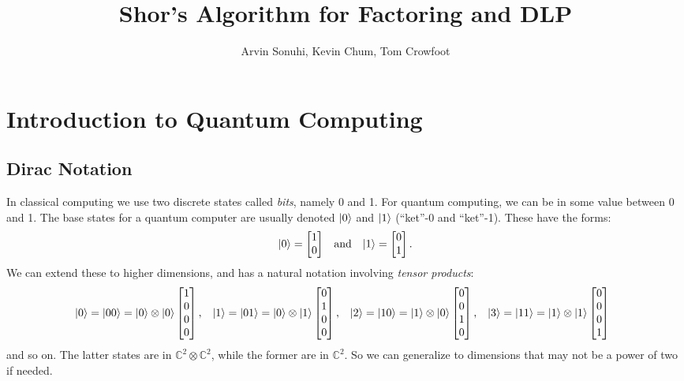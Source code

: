 \documentclass[letterpaper]{article}
\title{Shor's Algorithm for Factoring and DLP}
\author{Arvin Sonuhi, Kevin Chum, Tom Crowfoot}
\date{}
\DeclarePairedDelimiter{\ket}{\lvert}{\rangle}
\newcommand{\complex}{\mathbb{C}}
\newcommand{\tensor}{\otimes}
\begin{document}
	\maketitle{}
	\section{Introduction to Quantum Computing}
	\subsection{Dirac Notation}
	In classical computing we use two discrete states called \emph{bits}, namely
	0 and 1. For quantum computing, we can be in some value between 0 and 1. The
	base states for a quantum computer are usually denoted $\ket0$ and $\ket1$
	(``ket''-0 and ``ket''-1). These have the forms:
	\begin{align*}
		\ket0 = \begin{bmatrix}1\\0\end{bmatrix} &&\text{and} && \ket1 =
		\begin{bmatrix}0\\1\end{bmatrix}.
	\end{align*}
	We can extend these to higher dimensions, and has a natural notation
	involving \emph{tensor products}:
	\begin{align*}\hspace{-0.5em}
		\ket0 = \ket{00} = \ket0\tensor\ket0 \begin{bmatrix}1\\0\\0\\0\end{bmatrix}, &&
		\ket1 = \ket{01} = \ket0\tensor\ket1 \begin{bmatrix}0\\1\\0\\0\end{bmatrix}, &&
		\ket2 = \ket{10} = \ket1\tensor\ket0 \begin{bmatrix}0\\0\\1\\0\end{bmatrix}, &&
		\ket3 = \ket{11} = \ket1\tensor\ket1 \begin{bmatrix}0\\0\\0\\1\end{bmatrix}
	\end{align*}
	and so on. The latter states are in $\complex^{2}\tensor\complex^{2}$, while
	the former are in $\complex^2$. So we can generalize to dimensions that may
	not be a power of two if needed.
\end{document}
